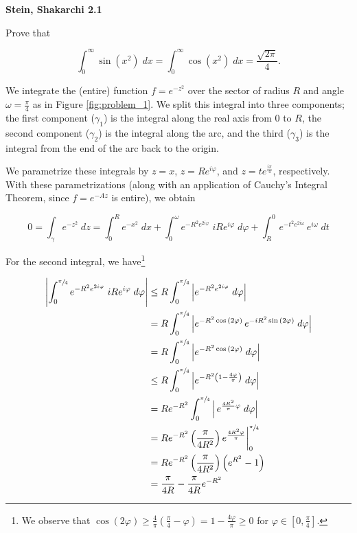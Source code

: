 \textbf{Stein, Shakarchi 2.1}

Prove that 

$$
\int_{0}^{\infty}{\sin{\left( x^2 \right)} \; dx} = \int_{0}^{\infty}{\cos{\left( x^2 \right)} \; dx} 
                                                  = \frac{\sqrt{2\pi}}{4}.
$$

\begin{solution}
    We integrate the (entire) function $f = e^{-z^2}$ over the sector of radius $R$ and angle $\omega = \frac{\pi}{4}$
    as in Figure \ref{fig:problem_1}. We split this integral into three components; the first component 
    ($\gamma_1$) is the integral along the real axis from $0$ to $R$, the second component ($\gamma_2$) is the integral 
    along the arc, and the third ($\gamma_3$) is the integral from the end of the arc back to the origin. 
 
    We parametrize these integrals by $z = x$, $z = Re^{i\varphi}$, and $z = t e^{\frac{i \pi}{4}}$, respectively. With 
    these parametrizations (along with an application of Cauchy's Integral Theorem, since $f = e^{-Az}$ is entire), we 
    obtain

    $$
    0 = \int_{\gamma} {e^{-z^2}} \; dz = \int_{0}^{R} {e^{-x^2}} \; dx + \int_{0}^{\omega} {e^{-R^2 e^{2 i\varphi}} \; iRe^{i\varphi}} \; d\varphi + \int_{R}^{0} {e^{-t^2 e^{2 i\omega}} \, e^{i\omega}} \; dt
    $$

    For the second integral, we have\footnote{
        We observe that 
        $\cos{(2\varphi)} \ge \frac{4}{\pi} \left( \frac{\pi}{4} - \varphi \right) = 1 - \frac{4\varphi}{\pi} \ge 0$ for 
        $\varphi \in \left[0, \frac{\pi}{4}\right]$.
    }

    \begin{align*}
        \left| \int_0^{\sfrac{\pi}{4}} {e^{-R^2 e^{2 i \varphi}} \; i R e^{i \varphi}} \; d\varphi \right|
        &\le R \int_0^{\sfrac{\pi}{4}} {\left| e^{-R^2 e^{2 i \varphi}} \; d\varphi \right|} \\
        &=   R \int_0^{\sfrac{\pi}{4}} {\left| e^{-R^2 \cos{(2 \varphi)}} \, e^{-i R^2 \sin{(2 \varphi)}} \; d\varphi \right|} \\
        &=   R \int_0^{\sfrac{\pi}{4}} {\left| e^{-R^2 \cos{(2 \varphi)}} \; d\varphi \right|} \\
        &\le R \int_0^{\sfrac{\pi}{4}} {\left| e^{-R^2 \left(1 - \frac{4 \varphi}{\pi}\right)} \; d\varphi \right|} \\
        &=   R e^{-R^2} \int_0^{\sfrac{\pi}{4}} {\left| \, e^{\frac{4 R^2}{\pi} \varphi} \; d\varphi \right|} \\
        &=   R e^{-R^2} \left( \frac{\pi}{4 R^2} \right) e^{\frac{4 R^2 \varphi}{\pi}} \bigg|_0^{\sfrac{\pi}{4}} \\
        &=   R e^{-R^2} \left( \frac{\pi}{4 R^2} \right) \left(e^{R^2} - 1 \right) \\
        &=   \frac{\pi}{4 R} - \frac{\pi}{4 R} e^{-R^2} \\
    \end{align*}


\end{solution}
